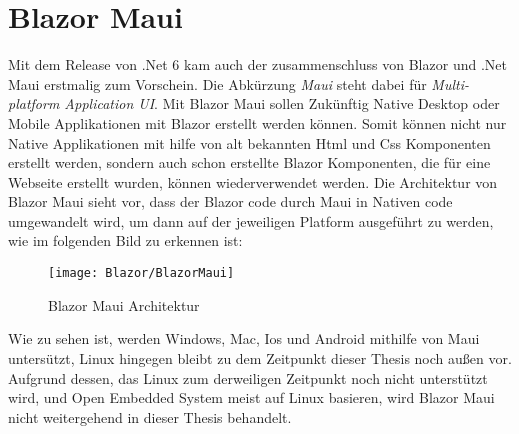 \section{Blazor Maui}
\label{sec:blazormaui}
Mit dem Release von .Net 6 kam auch der zusammenschluss von Blazor und .Net Maui erstmalig zum
Vorschein. Die Abkürzung \emph{Maui} steht dabei für \emph{Multi-platform Application UI}. Mit
Blazor Maui sollen Zukünftig Native Desktop oder Mobile Applikationen mit Blazor erstellt werden
können. Somit können nicht nur Native Applikationen mit hilfe von alt bekannten Html und Css
Komponenten erstellt werden, sondern auch schon erstellte Blazor Komponenten, die für eine
Webseite erstellt wurden, können wiederverwendet werden.
\newline
\newline
Die Architektur von Blazor Maui sieht vor, dass der Blazor code durch Maui in Nativen code
umgewandelt wird, um dann auf der jeweiligen Platform ausgeführt zu werden, wie im folgenden Bild
zu erkennen ist:

\begin{figure}[h]
    \centering
    \texttt{[image: Blazor/BlazorMaui]}
    \caption[Blazor Maui Architektur]{Blazor Maui Architektur}
    \label{img:BlazorMaui}
\end{figure}

Wie zu sehen ist, werden Windows, Mac, Ios und Android mithilfe von Maui untersützt, Linux
hingegen bleibt zu dem Zeitpunkt dieser Thesis noch außen vor.
\newline
\newline
Aufgrund dessen, das Linux zum derweiligen Zeitpunkt noch nicht unterstützt wird, und Open
Embedded System meist auf Linux basieren, wird Blazor Maui nicht weitergehend in dieser Thesis
behandelt.